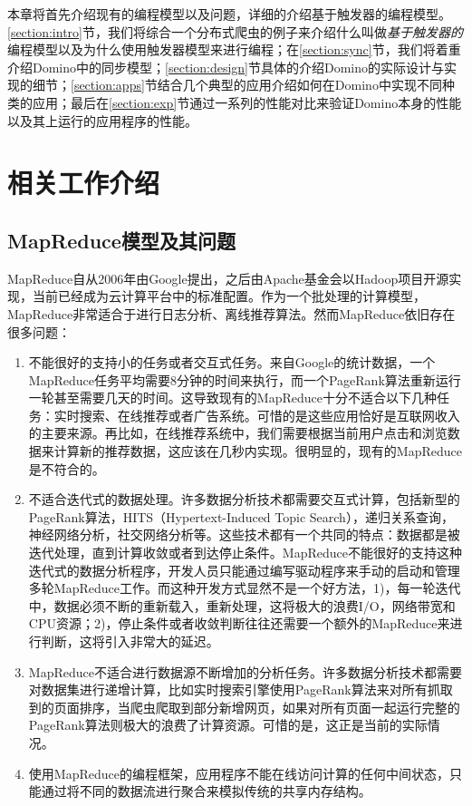 本章将首先介绍现有的编程模型以及问题，详细的介绍基于触发器的编程模型。\ref{section:intro}节，我们将综合一个分布式爬虫的例子来介绍什么叫做\textit{基于触发器的}编程模型以及为什么使用触发器模型来进行编程；在\ref{section:sync}节，我们将着重介绍Domino中的同步模型；\ref{section:design}节具体的介绍Domino的实际设计与实现的细节；\ref{section:apps}节结合几个典型的应用介绍如何在Domino中实现不同种类的应用；最后在\ref{section:exp}节通过一系列的性能对比来验证Domino本身的性能以及其上运行的应用程序的性能。

\section{相关工作介绍}

\subsection{MapReduce模型及其问题}

MapReduce自从2006年由Google提出，之后由Apache基金会以Hadoop项目开源实现，当前已经成为云计算平台中的标准配置。作为一个批处理的计算模型，MapReduce非常适合于进行日志分析、离线推荐算法。然而MapReduce依旧存在很多问题：
\begin{enumerate}
\item 不能很好的支持小的任务或者交互式任务。来自Google的统计数据，一个MapReduce任务平均需要8分钟的时间来执行，而一个PageRank算法重新运行一轮甚至需要几天的时间。这导致现有的MapReduce十分不适合以下几种任务：实时搜索、在线推荐或者广告系统。可惜的是这些应用恰好是互联网收入的主要来源。再比如，在线推荐系统中，我们需要根据当前用户点击和浏览数据来计算新的推荐数据，这应该在几秒内实现。很明显的，现有的MapReduce是不符合的。

\item 不适合迭代式的数据处理。许多数据分析技术都需要交互式计算，包括新型的PageRank算法，HITS（Hypertext-Induced Topic Search），递归关系查询，神经网络分析，社交网络分析等。这些技术都有一个共同的特点：数据都是被迭代处理，直到计算收敛或者到达停止条件。MapReduce不能很好的支持这种迭代式的数据分析程序，开发人员只能通过编写驱动程序来手动的启动和管理多轮MapReduce工作。而这种开发方式显然不是一个好方法，1)，每一轮迭代中，数据必须不断的重新载入，重新处理，这将极大的浪费I/O，网络带宽和CPU资源；2)，停止条件或者收敛判断往往还需要一个额外的MapReduce来进行判断，这将引入非常大的延迟。

\item	MapReduce不适合进行数据源不断增加的分析任务。许多数据分析技术都需要对数据集进行递增计算，比如实时搜索引擎使用PageRank算法来对所有抓取到的页面排序，当爬虫爬取到部分新增网页，如果对所有页面一起运行完整的PageRank算法则极大的浪费了计算资源。可惜的是，这正是当前的实际情况。

\item 使用MapReduce的编程框架，应用程序不能在线访问计算的任何中间状态，只能通过将不同的数据流进行聚合来模拟传统的共享内存结构。

\end{enumerate}

